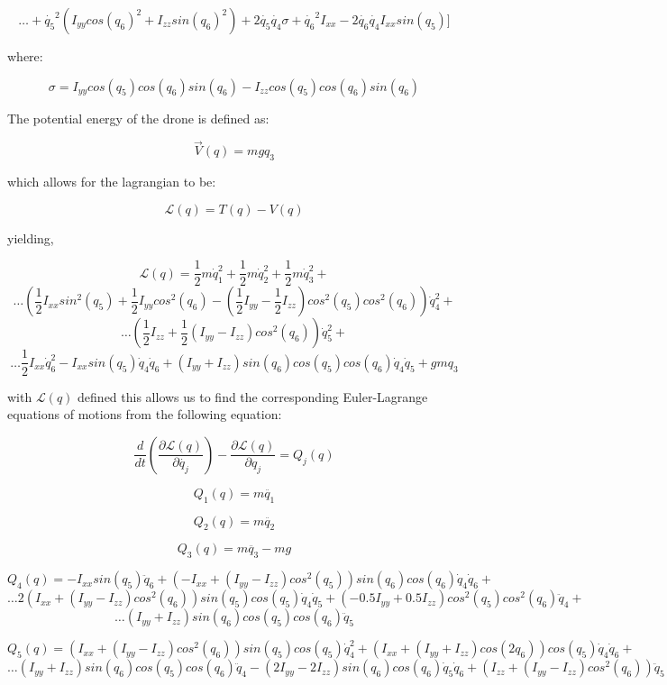 \documentclass[10pt, letterpaper]{article}
\begin{document}
\[
\ldots+\dot{q_{5}}^{2}(I_{yy}cos(q_{6})^{2}+I_{zz}sin(q_{6})^{2})+2\dot{q_{5}}\dot{q_{4}}\sigma+\dot{q_{6}}^{2}I_{xx}-2\dot{q_{6}}\dot{q_{4}}I_{xx}sin(q_{5})]
\]

where:

\[
\sigma=I_{yy}cos(q_{5})cos(q_{6})sin(q_{6})-I_{zz}cos(q_{5})cos(q_{6})sin(q_{6})
\]

The potential energy of the drone is defined as:

\[
\overrightarrow{V}(q)=mgq_{3}
\]

which allows for the lagrangian to be:

\[
\mathcal{L}(q)=T(q)-V(q)
\]

yielding,

\[
\mathcal{L}(q) = \frac{1}{2} m \dot{q}_{1}^{2} + \frac{1}{2} m \dot{q}_{2}^{2} + \frac{1}{2} m \dot{q}_{3}^{2} + 
\]
\[
\ldots(\frac{1}{2} I_{xx} {sin}^{2}(q_{5}) + \frac{1}{2} I_{yy} {cos}^{2}(q_{6}) - (\frac{1}{2} I_{yy} - \frac{1}{2} I_{zz}) {cos}^{2}(q_{5}) {cos}^{2}(q_{6})) \dot{q}_{4}^{2} + 
\]
\[
\dots(\frac{1}{2} I_{zz} + \frac{1}{2} (I_{yy} - I_{zz}) {cos}^{2}(q_{6})) \dot{q}_{5}^{2} + 
\]
\[
\ldots\frac{1}{2} I_{xx} \dot{q}_{6}^{2} - I_{xx} {sin}(q_{5}) \dot{q}_{4} \dot{q}_{6} + (I_{yy} + I_{zz}) {sin}(q_{6}) {cos}(q_{5}) {cos}(q_{6}) \dot{q}_{4} \dot{q}_{5}+ g m q_{3}
\]

with $\mathcal{L}(q)$ defined this allows us to find the corresponding
Euler-Lagrange equations of motions from the following equation:

\[
\frac{d}{dt}(\frac{\partial\mathcal{L}(q)}{\partial\dot{q_{j}}})-\frac{\partial\mathcal{L}(q)}{\partial q_{j}}=Q_{j}(q)
\]

\[
Q_{1}(q)=m\ddot{q_{1}}
\]

\[
Q_{2}(q)=m\ddot{q_{2}}
\]

\[
Q_{3}(q)=m\ddot{q_{3}}-mg
\]

\[
Q_{4}(q) = - I_{xx} {sin}(q_{5}) \ddot{q}_{6} + (- I_{xx} + (I_{yy} - I_{zz}) {cos}^{2}(q_{5})) {sin}(q_{6}) {cos}(q_{6}) \dot{q}_{4} \dot{q}_{6} + 
\]
\[
\ldots2 (I_{xx} + (I_{yy} - I_{zz}) {cos}^{2}(q_{6})) {sin}(q_{5}) {cos}(q_{5}) \dot{q}_{4} \dot{q}_{5} + (- 0.5 I_{yy} + 0.5 I_{zz}) {cos}^{2}(q_{5}) {cos}^{2}(q_{6}) \ddot{q}_{4} +
\]
\[ 
\ldots(I_{yy} + I_{zz}) {sin}(q_{6}) {cos}(q_{5}) {cos}(q_{6}) \ddot{q}_{5}
\]

\[
Q_{5}(q) =(I_{xx} + (I_{yy} - I_{zz}) {cos}^{2}(q_{6})) {sin}(q_{5}) {cos}(q_{5}) \dot{q}_{4}^{2} + (I_{xx} + (I_{yy} + I_{zz}) {cos}(2 q_{6})) {cos}(q_{5}) \dot{q}_{4} \dot{q}_{6} + 
\]
\[
\ldots(I_{yy} + I_{zz}) {sin}(q_{6}) {cos}(q_{5}) {cos}(q_{6}) \ddot{q}_{4} - (2 I_{yy} - 2 I_{zz}) {sin}(q_{6}) {cos}(q_{6}) \dot{q}_{5} \dot{q}_{6} + (I_{zz} + (I_{yy} - I_{zz}) {cos}^{2}(q_{6})) \ddot{q}_{5}
\]
\end{document}
